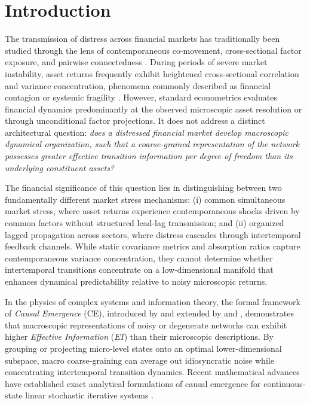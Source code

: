 \documentclass[review,12pt,authoryear]{elsarticle}
\begin{document}
\doublespacing

\section{Introduction}
\label{sec:intro}

The transmission of distress across financial markets has traditionally been studied through the lens of contemporaneous co-movement, cross-sectional factor exposure, and pairwise connectedness \citep{billio2012econometric, diebold2012better, adrian2016covar, brownlees2017srisk}. During periods of severe market instability, asset returns frequently exhibit heightened cross-sectional correlation and variance concentration, phenomena commonly described as financial contagion or systemic fragility \citep{acharya2017measuring, kritzman2011principal}. However, standard econometrics evaluates financial dynamics predominantly at the observed microscopic asset resolution or through unconditional factor projections. It does not address a distinct architectural question: \emph{does a distressed financial market develop macroscopic dynamical organization, such that a coarse-grained representation of the network possesses greater effective transition information per degree of freedom than its underlying constituent assets?}

The financial significance of this question lies in distinguishing between two fundamentally different market stress mechanisms: (i) common simultaneous market stress, where asset returns experience contemporaneous shocks driven by common factors without structured lead-lag transmission; and (ii) organized lagged propagation across sectors, where distress cascades through intertemporal feedback channels. While static covariance metrics and absorption ratios capture contemporaneous variance concentration, they cannot determine whether intertemporal transitions concentrate on a low-dimensional manifold that enhances dynamical predictability relative to noisy microscopic returns.

In the physics of complex systems and information theory, the formal framework of \emph{Causal Emergence} (CE), introduced by \citet{hoel2013quantifying} and extended by \citet{klein2020emergence} and \citet{rosas2020reconciling}, demonstrates that macroscopic representations of noisy or degenerate networks can exhibit higher \emph{Effective Information} ($EI$) than their microscopic descriptions. By grouping or projecting micro-level states onto an optimal lower-dimensional subspace, macro coarse-graining can average out idiosyncratic noise while concentrating intertemporal transition dynamics. Recent mathematical advances have established exact analytical formulations of causal emergence for continuous-state linear stochastic iterative systems \citep{liu2024exact, liu2025singular, yang2025finding}.
\end{document}
